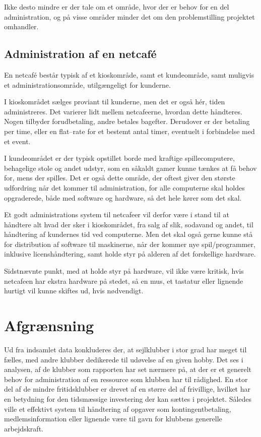Ikke desto mindre er der tale om et område, hvor der er behov for en del administration, og på visse områder
minder det om den problemstilling projektet omhandler.


\subsection{Administration af en netcafé}\label{sec:administration-af-en-netcafe}

En netcafé består typisk af et kioskområde, samt et kundeområde, samt muligvis et administrationsområde,
utilgængeligt for kunderne.

I kioskområdet sælges proviant til kunderne, men det er også hér, tiden administreres. Det varierer lidt
mellem netcafeerne, hvordan dette håndteres. Nogen tilbyder forudbetaling, andre betales bagefter. Derudover
er der betaling per time, eller en flat--rate for et bestemt antal timer, eventuelt i forbindelse med et
event.

I kundeområdet er der typisk opstillet borde med kraftige spillecomputere, behagelige stole og andet udstyr,
som en såkaldt gamer kunne tænkes at få behov for, mens der spilles. Det er også dette område, der oftest
giver den største udfordring når det kommer til administration, for alle computerne skal holdes opgraderede,
både med software og hardware, så det hele kører som det skal.

Et godt administrations system til netcafeer vil derfor være i stand til at håndtere alt hvad der sker i
kioskområdet, fra salg af slik, sodavand og andet, til håndtering af kundernes tid ved computerne. Men det
skal også gerne kunne stå for distribution af software til maskinerne, når der kommer nye spil/programmer,
inklusive licenshåndtering, samt holde styr på alderen af det forskellige hardware.

Sidstnævnte punkt, med at holde styr på hardware, vil ikke være kritisk, hvis netcafeen har ekstra hardware på
stedet, så en mus, et tastatur eller lignende hurtigt vil kunne skiftes ud, hvis nødvendigt.


\section{Afgrænsning}

Ud fra indsamlet data konkluderes der, at sejlklubber i stor grad har meget til fælles, med andre klubber dedikerede til udøvelse af en given hobby. Det ses i analysen, af de klubber som rapporten har set nærmere på, at der er et generelt behov for administration af en ressource som klubben har til rådighed. En stor del af de mindre fritidsklubber er drevet af en større del af frivillige, hvilket har en betydning for den tidsmæssige investering der kan sættes i projektet. Således ville et effektivt system til håndtering af opgaver som kontingentbetaling, medlemsinformation eller lignende være til gavn for klubbens generelle arbejdskraft.


